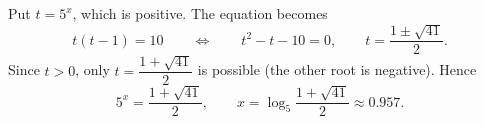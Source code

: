 Put $t=5^x$, which is positive. The equation becomes
\[
t(t-1)=10\qquad\Longleftrightarrow\qquad t^2-t-10=0,\qquad t=\dfrac{1\pm\sqrt{41}}{2}.
\]
Since $t>0$, only $t=\dfrac{1+\sqrt{41}}{2}$ is possible (the other root is negative). Hence
\[
5^x=\dfrac{1+\sqrt{41}}{2},\qquad x=\boxed{\log_5\dfrac{1+\sqrt{41}}{2}}\approx0.957 .
\]
